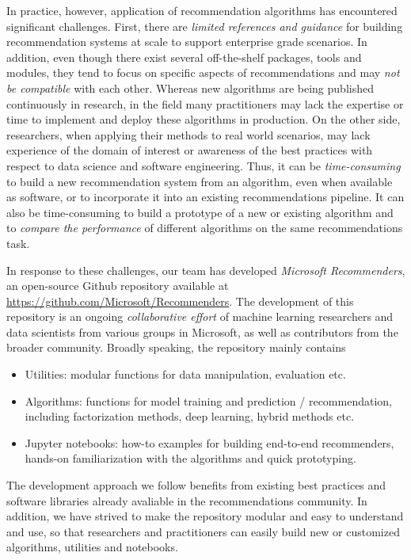 In practice, however, application of recommendation algorithms has encountered significant challenges. 
First, there are {\em limited references and guidance} for building recommendation systems at scale to support
enterprise grade scenarios. In addition, even though there exist several off-the-shelf packages, tools and modules, they tend to focus on specific aspects of recommendations 
and may {\em not be compatible} with each other. Whereas new algorithms are being published continuously in research, in the field many practitioners may lack the 
expertise or time to implement and deploy these algorithms in production. 
On the other side, researchers, when applying their methods to real world scenarios, may lack experience of the domain of interest
or awareness of the best practices with respect to data science and software engineering. Thus, it can be {\em time-consuming} to build a new recommendation system from an
algorithm, even when available as software, or to incorporate it into an existing recommendations pipeline. It can also be time-consuming to build a prototype of a new or existing algorithm and to 
{\em compare the performance} of different algorithms on the same recommendations task. 

In response to these challenges, our team has developed {\em Microsoft Recommenders}, an open-source 
Github repository available at \url{https://github.com/Microsoft/Recommenders}.
The development of this repository is an ongoing {\em collaborative effort} of machine learning researchers and data scientists from 
various groups in Microsoft, as well as contributors from the broader community.
Broadly speaking, the repository mainly contains 
\begin{itemize}
\item
Utilities: modular functions for data manipulation, evaluation etc.
\item
Algorithms: functions for model training and prediction / recommendation, including factorization methods, deep learning, hybrid methods etc.
\item
Jupyter notebooks: how-to examples for building end-to-end recommenders, hands-on familiarization with the algorithms and quick prototyping. 
\end{itemize}
The development approach we follow benefits from existing best practices and software libraries already avaliable in the recommendations community.
In addition, we have strived to make the repository modular and easy to understand and use, so that researchers and practitioners can easily build
new or customized algorithms, utilities and notebooks.

